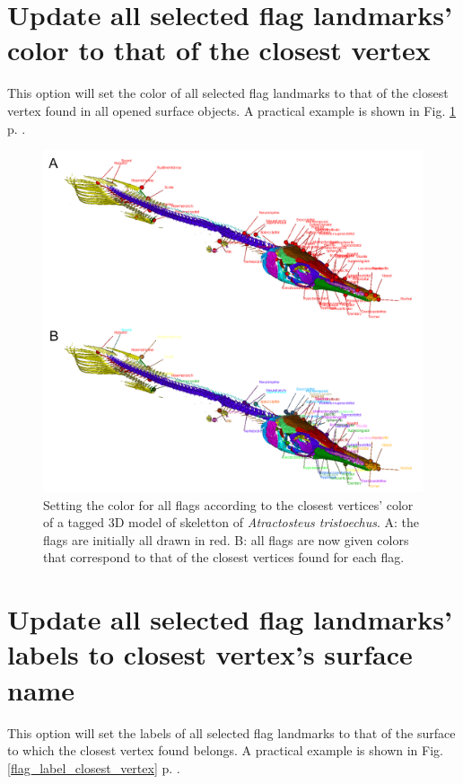 \section{Update all selected flag landmarks' color to that of the closest vertex}

This option will set the color of all selected flag landmarks to that of the closest vertex found in all opened surface objects. A practical example is shown in Fig. \ref{flag_color_closest_vertex} p. \pageref{flag_color_closest_vertex}.

\begin{figure}
  \centering
  \includegraphics[scale=0.31]{images/10/edit_flag_color_closest_vertex.png} 
	\caption{Setting the color for all flags according to the closest vertices' color of a tagged 3D model of skeletton of \textit{Atractosteus tristoechus}. A: the flags are initially all  drawn in red. B: all flags are now given colors that correspond to that of the closest vertices found for each flag.}
\label{flag_color_closest_vertex}
\end{figure}


\section{Update all selected flag landmarks' labels to closest vertex's surface name}

This option will set the labels of all selected flag landmarks to that of the surface to which the closest vertex found belongs. A practical example is shown in Fig. \ref{flag_label_closest_vertex} p. \pageref{flag_label_closest_vertex}.

